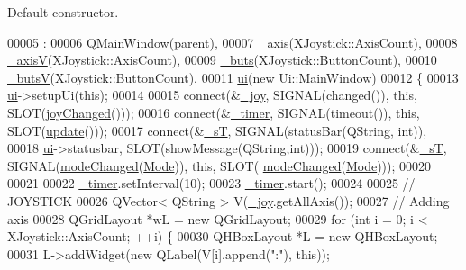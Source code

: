 Default constructor. 


\begin{DoxyCode}
00005                                       :
00006     QMainWindow(parent),
00007     \hyperlink{a00005_a30c99d7a544f74b0650758e5cc7ead5a}{\_axis}(XJoystick::AxisCount),
00008     \hyperlink{a00005_a20f66f574ed4c96d8dfc0013e1095f15}{\_axisV}(XJoystick::AxisCount),
00009     \hyperlink{a00005_a8eaf474e1b8672f32873ed009e28ce8a}{\_buts}(XJoystick::ButtonCount),
00010     \hyperlink{a00005_a519ae4630572cb63fbd04bce12fe8e77}{\_butsV}(XJoystick::ButtonCount),
00011     \hyperlink{a00005_a35466a70ed47252a0191168126a352a5}{ui}(\textcolor{keyword}{new} Ui::MainWindow)
00012 \{
00013     \hyperlink{a00005_a35466a70ed47252a0191168126a352a5}{ui}->setupUi(\textcolor{keyword}{this});
00014     
00015     connect(&\hyperlink{a00005_a671f35800890e518713e1946671d8730}{\_joy}, SIGNAL(changed()), \textcolor{keyword}{this}, SLOT(\hyperlink{a00005_abb4c2d8a79c9f80010ea031366bf8226}{joyChanged}()));
00016     connect(&\hyperlink{a00005_a254b03b878cfda75c1c411a2f8568d33}{\_timer}, SIGNAL(timeout()), \textcolor{keyword}{this}, SLOT(\hyperlink{a00005_a128f71880d4b9683149023fc46fcc9f8}{update}()));
00017     connect(&\hyperlink{a00005_a97f8ecc7ecb930b796178cef7b975013}{\_sT}, SIGNAL(statusBar(QString, \textcolor{keywordtype}{int})), 
00018             \hyperlink{a00005_a35466a70ed47252a0191168126a352a5}{ui}->statusbar, SLOT(showMessage(QString,\textcolor{keywordtype}{int})));
00019     connect(&\hyperlink{a00005_a97f8ecc7ecb930b796178cef7b975013}{\_sT}, SIGNAL(\hyperlink{a00005_ac5254b38dd1e34b14e2539905c64e2d8}{modeChanged}(\hyperlink{a00005_a372482d77430e41c5483ab8605eece9d}{Mode})), \textcolor{keyword}{this}, SLOT(
      \hyperlink{a00005_ac5254b38dd1e34b14e2539905c64e2d8}{modeChanged}(\hyperlink{a00005_a372482d77430e41c5483ab8605eece9d}{Mode})));
00020     
00021     
00022     \hyperlink{a00005_a254b03b878cfda75c1c411a2f8568d33}{\_timer}.setInterval(10);
00023     \hyperlink{a00005_a254b03b878cfda75c1c411a2f8568d33}{\_timer}.start();
00024     
00025     \textcolor{comment}{// JOYSTICK}
00026     QVector< QString > V(\hyperlink{a00005_a671f35800890e518713e1946671d8730}{\_joy}.getAllAxis());
00027     \textcolor{comment}{// Adding axis}
00028     QGridLayout *wL = \textcolor{keyword}{new} QGridLayout;
00029     \textcolor{keywordflow}{for} (\textcolor{keywordtype}{int} i = 0; i < XJoystick::AxisCount; ++i) \{
00030         QHBoxLayout *L = \textcolor{keyword}{new} QHBoxLayout;
00031         L->addWidget(\textcolor{keyword}{new} QLabel(V[i].append(\textcolor{stringliteral}{":"}), \textcolor{keyword}{this}));

\end{DoxyCode}

